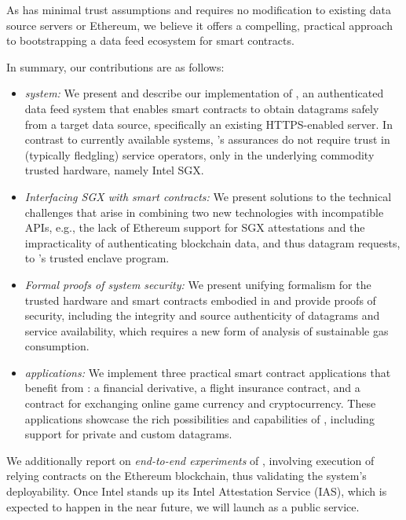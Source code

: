 As \tc has minimal trust assumptions and requires no modification to existing data source servers or Ethereum, we believe it offers a compelling, practical approach to bootstrapping a data feed ecosystem for smart contracts. 
 
In summary, our contributions are as follows:

\vspace{-1mm}
\begin{itemize}
  \setlength{\itemsep}{2pt}
  \setlength{\parskip}{0pt}
  \setlength{\parsep}{0pt}

\item \emph{\tcs system:} We present and describe our implementation of \tc, an authenticated data feed system that enables smart contracts to obtain datagrams safely from a target data source, specifically an existing HTTPS-enabled server. In contrast to currently available systems, \tc's assurances do not require trust in (typically fledgling) service operators, only in the underlying commodity trusted hardware, namely Intel SGX. 

\item \emph{Interfacing SGX with smart contracts:} We present solutions to the technical challenges that arise in combining two new technologies with incompatible APIs, e.g., the lack of Ethereum support for SGX attestations and the impracticality of authenticating blockchain data, and thus datagram requests, to \tc's trusted enclave program. 

\item \emph{Formal proofs of \tc system security:} We present unifying formalism for the trusted hardware and smart contracts embodied in \tc and provide proofs of security, including the integrity and source authenticity of datagrams and service availability, which requires a new form of analysis of sustainable gas consumption. 

\item \emph{\tc applications:} We implement three practical smart contract applications that benefit from \tc: a financial derivative, a flight insurance contract, and a contract for exchanging online game currency and cryptocurrency. These applications showcase the rich possibilities and capabilities of \tc, including support for private and custom datagrams. 

\end{itemize}

We additionally report on {\em end-to-end experiments} of \tc, involving execution of relying contracts on the Ethereum blockchain, thus validating the system's deployability. Once Intel stands up its Intel Attestation Service (IAS), which is expected to happen in the near future, we will launch \tc as a public service. 




\fi







